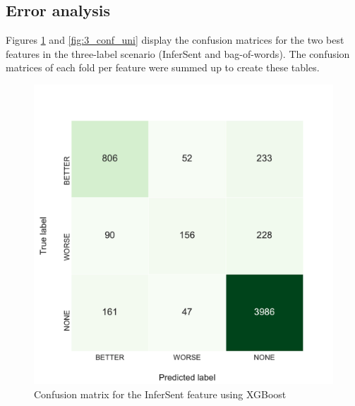 \FloatBarrier
\subsection{Error analysis}
\label{sec:error_analysis}
Figures \ref{fig:3_conf_inf} and \ref{fig:3_conf_uni} display the confusion matrices for the two best features in the three-label scenario (InferSent and bag-of-words). The confusion matrices of each fold per feature were summed up to create these tables.





\begin{figure}[h]
    \begin{minipage}{.5\linewidth}
   \caption{Confusion matrix for the InferSent feature using XGBoost} 
    \label{fig:3_conf_inf}
 \centering
	\includegraphics[width=1\linewidth]{images/experiments/conf-InferSent_False}
  \end{minipage} \hfill
    \begin{minipage}{.5\linewidth}
  

\end{minipage}
\end{figure}
